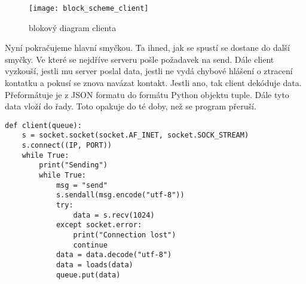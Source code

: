 \documentclass[12pt]{report}			%
\begin{document}
\begin{figure}[h]
\caption{blokový diagram clienta}
\centering
 \texttt{[image: block\_scheme\_client]}
\end{figure}

Nyní pokračujeme hlavní smyčkou. Ta ihned, jak se spustí se dostane do další smyčky. Ve které se nejdříve serveru pošle požadavek na send. Dále client vyzkouší, jestli mu server poslal data, jestli ne vydá chybové hlášení o ztracení kontatku a pokusí se znova navázat kontakt. Jestli ano, tak client dekóduje data. Přeformátuje je z JSON formatu do formátu Python objektu tuple. Dále tyto data vloží do řady. Toto opakuje do té doby, než se program přeruší. 

\begin{lstlisting}[title={Program client.py}, caption={client.py}]
def client(queue):
    s = socket.socket(socket.AF_INET, socket.SOCK_STREAM)
    s.connect((IP, PORT))
    while True:
        print("Sending")
        while True:
            msg = "send"
            s.sendall(msg.encode("utf-8"))
            try:
                data = s.recv(1024)
            except socket.error:
                print("Connection lost")
                continue
            data = data.decode("utf-8")
            data = loads(data)
            queue.put(data)

\end{lstlisting}
\end{document}
